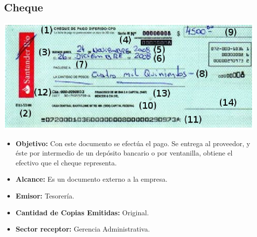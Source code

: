 \pagebreak
\subsection{Cheque}
\begin{center}
 \includegraphics[scale=0.9,keepaspectratio=true]{./Circuitos-Teoricos/Pago-a-Proveedores/Images/cheque.png}
\end{center}

\begin{itemize}
  \item \textbf{Objetivo:} Con este documento se efectúa el pago. Se entrega al proveedor, y éste por intermedio de un depósito bancario o por ventanilla, obtiene el efectivo que el cheque representa.
  \item \textbf{Alcance:} Es un documento externo a la empresa.
  \item \textbf{Emisor:} Tesorería.
  \item \textbf{Cantidad de Copias Emitidas:} Original.
  \item \textbf{Sector receptor:} Gerencia Administrativa.
\end{itemize}

